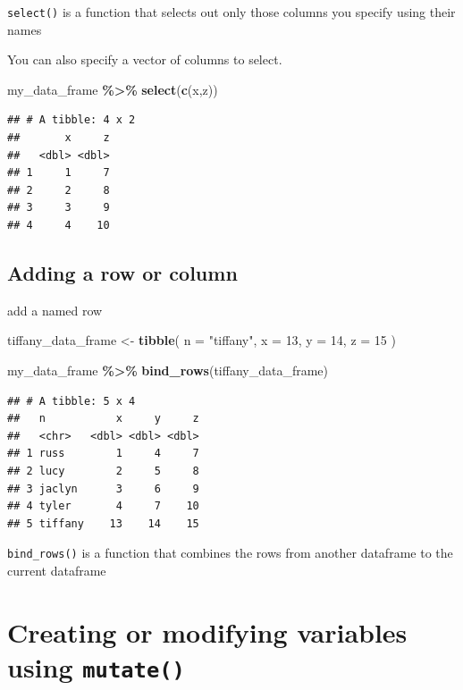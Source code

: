 \documentclass[
  12pt,
]{book}
\newenvironment{Shaded}{\begin{snugshade}}{\end{snugshade}}
\newcommand{\AttributeTok}[1]{\textcolor[rgb]{0.13,0.29,0.53}{#1}}
\newcommand{\DecValTok}[1]{\textcolor[rgb]{0.00,0.00,0.81}{#1}}
\newcommand{\FunctionTok}[1]{\textcolor[rgb]{0.13,0.29,0.53}{\textbf{#1}}}
\newcommand{\NormalTok}[1]{#1}
\newcommand{\OtherTok}[1]{\textcolor[rgb]{0.56,0.35,0.01}{#1}}
\newcommand{\SpecialCharTok}[1]{\textcolor[rgb]{0.81,0.36,0.00}{\textbf{#1}}}
\newcommand{\StringTok}[1]{\textcolor[rgb]{0.31,0.60,0.02}{#1}}
\begin{document}
\texttt{select()} is a function that selects out only those columns you specify using their names

You can also specify a vector of columns to select.

\begin{Shaded}
\begin{Highlighting}[]
\NormalTok{my\_data\_frame }\SpecialCharTok{\%\textgreater{}\%} 
  \FunctionTok{select}\NormalTok{(}\FunctionTok{c}\NormalTok{(x,z))}
\end{Highlighting}
\end{Shaded}

\begin{verbatim}
## # A tibble: 4 x 2
##       x     z
##   <dbl> <dbl>
## 1     1     7
## 2     2     8
## 3     3     9
## 4     4    10
\end{verbatim}

\hypertarget{adding-a-row-or-column}{%
\subsection{Adding a row or column}\label{adding-a-row-or-column}}

add a named row

\begin{Shaded}
\begin{Highlighting}[]
\NormalTok{tiffany\_data\_frame }\OtherTok{\textless{}{-}}
  \FunctionTok{tibble}\NormalTok{(}
    \AttributeTok{n =} \StringTok{"tiffany"}\NormalTok{,}
    \AttributeTok{x =} \DecValTok{13}\NormalTok{,}
    \AttributeTok{y =} \DecValTok{14}\NormalTok{,}
    \AttributeTok{z =} \DecValTok{15}
\NormalTok{  )}

\NormalTok{my\_data\_frame }\SpecialCharTok{\%\textgreater{}\%} 
  \FunctionTok{bind\_rows}\NormalTok{(tiffany\_data\_frame)}
\end{Highlighting}
\end{Shaded}

\begin{verbatim}
## # A tibble: 5 x 4
##   n           x     y     z
##   <chr>   <dbl> <dbl> <dbl>
## 1 russ        1     4     7
## 2 lucy        2     5     8
## 3 jaclyn      3     6     9
## 4 tyler       4     7    10
## 5 tiffany    13    14    15
\end{verbatim}

\texttt{bind\_rows()} is a function that combines the rows from another dataframe to the current dataframe

\hypertarget{creating-or-modifying-variables-using-mutate}{%
\section{\texorpdfstring{Creating or modifying variables using \texttt{mutate()}}{Creating or modifying variables using mutate()}}\label{creating-or-modifying-variables-using-mutate}}
\end{document}
